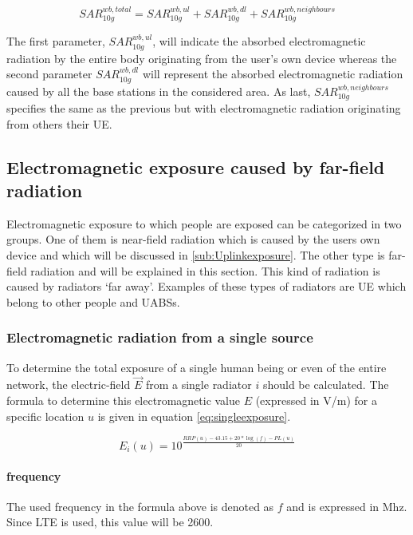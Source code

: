 \begin{equation} 
SAR^{wb,total}_{10g} = SAR^{wb,ul}_{10g} +  SAR^{wb,dl}_{10g} + SAR^{wb,neighbours}_{10g}
\label{eq:overallSARwb}
\end{equation}

The first parameter, $SAR^{wb,ul}_{10g}$, will indicate the absorbed electromagnetic radiation by the entire body originating from the user's own device
whereas the second parameter $SAR^{wb,dl}_{10g}$ will represent the absorbed electromagnetic radiation caused by all the base stations in the considered area.
As last, $SAR^{wb,neighbours}_{10g} $ specifies the same as the previous but with electromagnetic radiation originating from others their \gls{UE}.

\subsection{Electromagnetic exposure caused by far-field radiation} %
\label{sub:Calculatingdownlinkexpsure}

Electromagnetic exposure to which people are exposed can be categorized in two groups. One of them is near-field radiation which is caused 
by the users own device and which will be discussed in \ref{sub:Uplinkexposure}.
The other type is far-field radiation and will be explained in this section. This kind of radiation is caused by radiators `far away'.
Examples of these types of radiators are \gls{UE} which belong to other people and \gls{UABS}s. 

\subsubsection{Electromagnetic radiation from a single source}
\label{sec:calculatingexposure}

To determine the total exposure of a single human being or even of the entire network, the electric-field $\vec{E}$ from a single radiator $i$ should be calculated.
The formula to determine this electromagnetic value $E$ (expressed in V/m) for a specific location $u$ is given in equation \ref{eq:singleexposure}.

\begin{equation}
E_i(u) = 10^{\frac{RRP(u) - 43.15 + 20*\log(f)- PL(u)}{20}}
\label{eq:singleexposure}
\end{equation}

\paragraph{frequency}
The used frequency in the formula above is denoted as $f$ and is expressed in Mhz. Since LTE is used, this value will be 2600.

